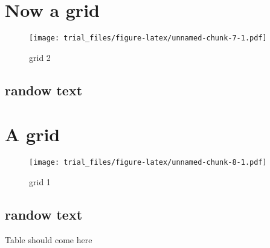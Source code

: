 \documentclass[]{article}
\begin{document}
\section{Now a grid}\label{now-a-grid}

\begin{figure}[htbp]
\centering
\texttt{[image: trial\_files/figure-latex/unnamed-chunk-7-1.pdf]}
\caption{grid 2}
\end{figure}

\subsection{randow text}\label{randow-text-3}

\lipsum

\section{A grid}\label{a-grid-1}

\begin{figure}[htbp]
\centering
\texttt{[image: trial\_files/figure-latex/unnamed-chunk-8-1.pdf]}
\caption{grid 1}
\end{figure}

\subsection{randow text}\label{randow-text-4}

\lipsum

Table should come here
\end{document}
